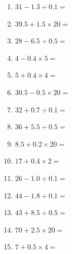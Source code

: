 \documentclass[12pt]{article}
\begin{document}
\begin{enumerate}
\item \large $ 31 - 1.3 \div 0.1 = $ \vspace{1.6cm}
\item \large $ 39.5 + 1.5 \times 20 = $ \vspace{1.6cm}
\item \large $ 28 - 6.5 \div 0.5 = $ \vspace{1.6cm}
\item \large $ 4 - 0.4 \times 5 = $ \vspace{1.6cm}
\item \large $ 5 + 0.4 \times 4 = $ \vspace{1.6cm}
\newpage
\item \large $ 30.5 - 0.5 \times 20 = $ \vspace{1.6cm}
\item \large $ 32 + 0.7 \div 0.1 = $ \vspace{1.6cm}
\item \large $ 36 + 5.5 \div 0.5 = $ \vspace{1.6cm}
\item \large $ 8.5 + 0.2 \times 20 = $ \vspace{1.6cm}
\item \large $ 17 + 0.4 \times 2 = $ \vspace{1.6cm}
\item \large $ 26 - 1.0 \div 0.1 = $ \vspace{1.6cm}
\item \large $ 44 - 1.8 \div 0.1 = $ \vspace{1.6cm}
\item \large $ 43 + 8.5 \div 0.5 = $ \vspace{1.6cm}
\item \large $ 70 + 2.5 \times 20 = $ \vspace{1.6cm}
\item \large $ 7 + 0.5 \times 4 = $ \vspace{1.6cm}
\end{enumerate}
\newpage
\end{document}
